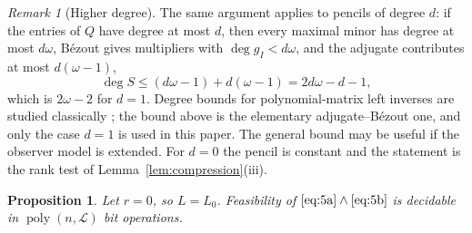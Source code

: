 \documentclass[journal]{IEEEtran}
\theoremstyle{plainn}
\newtheorem{prop}[thm]{Proposition}
\theoremstyle{remark}
\newtheorem{remark}{Remark}
\begin{document}
\begin{remark}[Higher degree]\label{rem:degree}
The same argument applies to pencils of degree $d$: if the entries of $Q$ have
degree at most $d$, then every maximal minor has degree at most $d\omega$,
B\'ezout gives multipliers with $\deg g_I<d\omega$, and the adjugate contributes
at most $d(\omega-1)$,
\begin{equation*}
\deg S\le(d\omega-1)+d(\omega-1)=2d\omega-d-1,
\end{equation*}
which is $2\omega-2$ for $d=1$. Degree bounds for polynomial-matrix left
inverses are studied classically \cite{fab90}; the bound above is the elementary
adjugate--B\'ezout one, and only the case $d=1$ is used in this paper. The
general bound may be useful if the observer model is extended. For $d=0$ the
pencil is constant and the statement is the rank test of
Lemma~\ref{lem:compression}(iii).
\end{remark}

\begin{prop}\label{prop:zero}
Let $r=0$, so $L=L_0$. Feasibility of $\eqref{eq:5a}\wedge\eqref{eq:5b}$ is
decidable in $\operatorname{poly}(n,\mathcal L)$ bit operations.
\end{prop}
\end{document}
